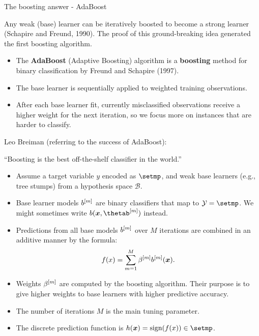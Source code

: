 

\begin{vbframe}{The boosting answer - AdaBoost}

Any weak (base) learner can be iteratively boosted to become
a strong learner (Schapire and Freund, 1990).
The proof of this ground-breaking idea generated the first boosting algorithm.

\begin{itemize}
  \item The \textbf{AdaBoost} (Adaptive Boosting) algorithm is a \textbf{boosting} method
    for binary classification by Freund and Schapire (1997).
  \item The base learner is sequentially applied to weighted training observations.
  \item After each base learner fit, currently misclassified observations receive a higher weight for
    the next iteration, so we focus more on instances that are harder to classify.
\end{itemize}

Leo Breiman (referring to the success of AdaBoost):

\enquote{Boosting is the best off-the-shelf classifier in the world.}

\framebreak

\begin{itemize}
  \item Assume a target variable $y$ encoded as $\setmp$,
    and weak base learners (e.g., tree stumps) from a hypothesis space $\mathcal{B}$.
  \item Base learner models $b^{[m]}$ are binary classifiers that map to $\Yspace = \setmp$.
    We might sometimes write $\blxt$ instead.
  \item Predictions from all base models $b^{[m]}$ over $M$ iterations are combined in an additive manner by the formula:
    $$
    f(x) = \sum_{m=1}^{M} \beta^{[m]} b^{[m]}(\bm{x}).
    $$
  \item Weights $\beta^{[m]}$ are computed by the boosting algorithm.
    Their purpose is to give higher weights to base learners with higher predictive accuracy.
  \item The number of iterations $M$ is the main tuning parameter.
  \item The discrete prediction function is $h(\xv) = \text{sign}(\fx) \in \setmp$.
\end{itemize}


\end{vbframe}
